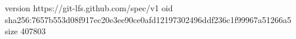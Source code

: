 version https://git-lfs.github.com/spec/v1
oid sha256:7657b553d08f917ec20e3ee90ce0afd12197302496ddf236c1f99967a51266a5
size 407803
